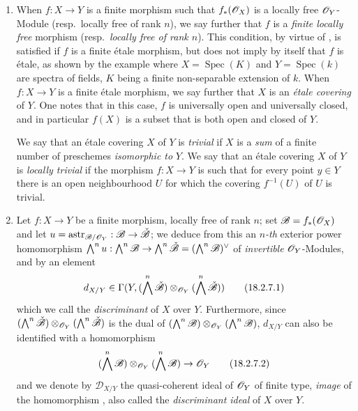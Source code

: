 \begin{remarks}[18.2.7]
\label{IV.18.2.7}
\begin{enumerate}
  \item[(i)] When $f:X\to Y$ is a finite morphism such that $f_*(\mathscr{O}_X)$ is a locally free $\mathscr{O}_Y$-Module (resp.\ locally free of rank $n$), we say further that $f$ is a \emph{finite locally free} morphism (resp.\ \emph{locally free of rank $n$}).
This condition, by virtue of , is satisfied if $f$ is a finite \'etale morphism, but does not imply by itself that $f$ is \'etale, as shown by the example where $X=\operatorname{Spec}(K)$ and $Y=\operatorname{Spec}(k)$ are spectra of fields, $K$ being a finite non-separable extension of $k$.
When $f:X\to Y$ is a finite \'etale morphism, we say further that $X$ is an \emph{\'etale covering} of $Y$.
One notes that in this case, $f$ is universally open and universally closed, and in particular $f(X)$ is a subset that is both open and closed of $Y$.

We say that an \'etale covering $X$ of $Y$ is \emph{trivial} if $X$ is a \emph{sum} of a finite number of preschemes \emph{isomorphic to} $Y$.
We say that an \'etale covering $X$ of $Y$ is \emph{locally trivial} if the morphism $f:X\to Y$ is such that for every point $y\in Y$ there is an open neighbourhood $U$ for which the covering $f^{-1}(U)$ of $U$ is trivial.

  \item[(ii)] Let $f:X\to Y$ be a finite morphism, locally free of rank $n$;
set $\mathscr{B}=f_*(\mathscr{O}_X)$ and let $u=\operatorname{astr}_{\mathscr{B}/\mathscr{O}_Y}:\mathscr{B}\to\check{\mathscr{B}}$;
we deduce from this an \emph{$n$-th} exterior power homomorphism
$\bigwedge^n u:\bigwedge^n\mathscr{B}\to\bigwedge^n\check{\mathscr{B}}=(\bigwedge^n\mathscr{B})^\vee$ of \emph{invertible} $\mathscr{O}_Y$-Modules, and by  an element
\[
\label{IV.18.2.7.1}
d_{X/Y}\in\Gamma(Y,(\bigwedge^n\check{\mathscr{B}})\otimes_{\mathscr{O}_Y}(\bigwedge^n\check{\mathscr{B}}))
\tag{18.2.7.1}
\]
which we call the \emph{discriminant} of $X$ over $Y$.
Furthermore, since $(\bigwedge^n\check{\mathscr{B}})\otimes_{\mathscr{O}_Y}(\bigwedge^n\check{\mathscr{B}})$ is the dual of $(\bigwedge^n\mathscr{B})\otimes_{\mathscr{O}_Y}(\bigwedge^n\mathscr{B})$, $d_{X/Y}$ can also be identified with a homomorphism
\[
\label{IV.18.2.7.2}
(\bigwedge^n\mathscr{B})\otimes_{\mathscr{O}_Y}(\bigwedge^n\mathscr{B})\to\mathscr{O}_Y
\tag{18.2.7.2}
\]
and we denote by $\mathscr{D}_{X/Y}$ the quasi-coherent ideal of $\mathscr{O}_Y$ of finite type, \emph{image} of the homomorphism , also called the \emph{discriminant ideal} of $X$ over $Y$.
\end{enumerate}
\end{remarks}

